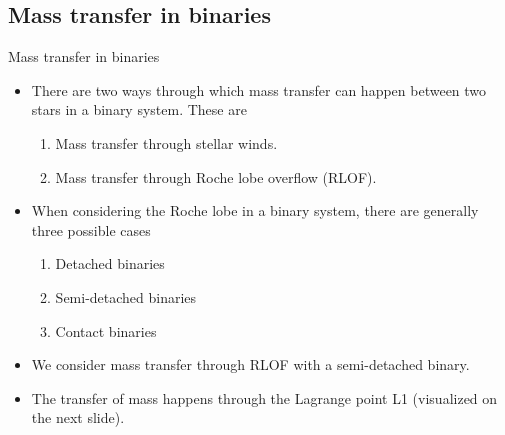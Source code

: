 \documentclass{beamer}
\begin{document}
\subsection{Mass transfer in binaries}
\begin{frame}{Mass transfer in binaries}
    \begin{itemize}
        \item<1-> There are two ways through which mass transfer can happen between two stars in a binary system. These are
        \begin{enumerate}
            \item<2-> Mass transfer through stellar winds.
            \item<3-> Mass transfer through \alert{Roche lobe overflow (RLOF)}.
        \end{enumerate}
        \item<4-> When considering the Roche lobe in a binary system, there are generally three possible cases
        \begin{enumerate}
            \item<5-> Detached binaries
            \item<6-> \alert{Semi-detached binaries}
            \item<7-> Contact binaries
        \end{enumerate}
        \item<8-> We consider mass transfer through RLOF with a semi-detached binary.
        \item<9-> The transfer of mass happens through the Lagrange point L1 (visualized on the next slide).
    \end{itemize}
\end{frame}
\end{document}
